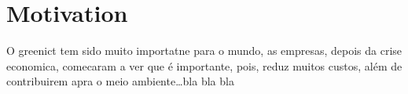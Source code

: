 

\chapter*{Motivation} \label{motivation}
O greenict tem sido muito importatne para o mundo, as empresas, depois da crise economica, comecaram a ver que é importante, pois, reduz muitos custos, além de contribuirem apra o meio ambiente\ldots bla bla bla



